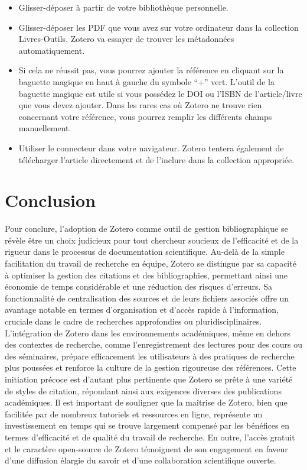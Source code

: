 \documentclass[
  letterpaper,
]{scrbook}
\providecommand{\tightlist}{%
  \setlength{\itemsep}{0pt}\setlength{\parskip}{0pt}}\usepackage{longtable,booktabs,array}
\begin{document}
\begin{itemize}
\tightlist
\item
  Glisser-déposer à partir de votre bibliothèque personnelle.
\item
  Glisser-déposer les PDF que vous avez sur votre ordinateur dans la
  collection Livres-Outils. Zotero va essayer de trouver les métadonnées
  automatiquement.
\item
  Si cela ne réussit pas, vous pourrez ajouter la référence en cliquant
  sur la baguette magique en haut à gauche du symbole ``+'' vert.
  L'outil de la baguette magique est utile si vous possédez le DOI ou
  l'ISBN de l'article/livre que vous devez ajouter. Dans les rares cas
  où Zotero ne trouve rien concernant votre référence, vous pourrez
  remplir les différents champs manuellement.
\item
  Utiliser le connecteur dans votre navigateur. Zotero tentera également
  de télécharger l'article directement et de l'inclure dans la
  collection appropriée.
\end{itemize}

\hypertarget{conclusion-2}{%
\section{Conclusion}\label{conclusion-2}}

Pour conclure, l'adoption de Zotero comme outil de gestion
bibliographique se révèle être un choix judicieux pour tout chercheur
soucieux de l'efficacité et de la rigueur dans le processus de
documentation scientifique. Au-delà de la simple facilitation du travail
de recherche en équipe, Zotero se distingue par sa capacité à optimiser
la gestion des citations et des bibliographies, permettant ainsi une
économie de temps considérable et une réduction des risques d'erreurs.
Sa fonctionnalité de centralisation des sources et de leurs fichiers
associés offre un avantage notable en termes d'organisation et d'accès
rapide à l'information, cruciale dans le cadre de recherches
approfondies ou pluridisciplinaires. L'intégration de Zotero dans les
environnements académiques, même en dehors des contextes de recherche,
comme l'enregistrement des lectures pour des cours ou des séminaires,
prépare efficacement les utilisateurs à des pratiques de recherche plus
poussées et renforce la culture de la gestion rigoureuse des références.
Cette initiation précoce est d'autant plus pertinente que Zotero se
prête à une variété de styles de citation, répondant ainsi aux exigences
diverses des publications académiques. Il est important de souligner que
la maîtrise de Zotero, bien que facilitée par de nombreux tutoriels et
ressources en ligne, représente un investissement en temps qui se trouve
largement compensé par les bénéfices en termes d'efficacité et de
qualité du travail de recherche. En outre, l'accès gratuit et le
caractère open-source de Zotero témoignent de son engagement en faveur
d'une diffusion élargie du savoir et d'une collaboration scientifique
ouverte.
\end{document}
